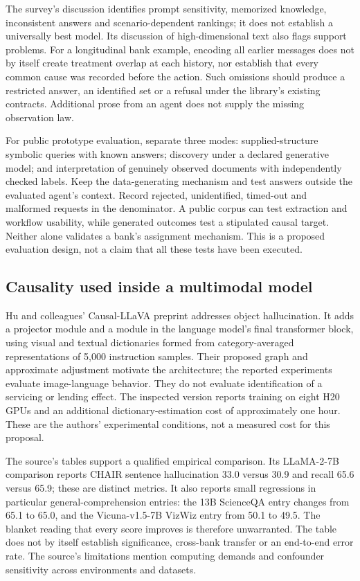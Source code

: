 The survey's discussion identifies prompt sensitivity, memorized knowledge, inconsistent answers and scenario-dependent
rankings; it does not establish a universally best model. Its discussion of high-dimensional text also flags support problems.
For a longitudinal bank example, encoding all earlier messages does not by itself create treatment overlap at each history,
nor establish that every common cause was recorded before the action. Such omissions should produce a restricted answer,
an identified set or a refusal under the library's existing contracts. Additional prose from an agent does not supply the
missing observation law.~\citep{exec28_fr_ma}

For public prototype evaluation, separate three modes: supplied-structure symbolic queries with known answers;
discovery under a declared generative model; and interpretation of genuinely observed documents with independently checked
labels. Keep the data-generating mechanism and test answers outside the evaluated agent's context. Record rejected,
unidentified, timed-out and malformed requests in the denominator. A public corpus can test extraction and workflow usability,
while generated outcomes test a stipulated causal target. Neither alone validates a bank's assignment mechanism.
This is a proposed evaluation design, not a claim that all these tests have been executed.

\subsection{Causality used inside a multimodal model}
Hu and colleagues' Causal-LLaVA preprint addresses object hallucination. It adds a projector module and a module in the
language model's final transformer block, using visual and textual dictionaries formed from category-averaged representations
of 5,000 instruction samples. Their proposed graph and approximate adjustment motivate the architecture; the reported
experiments evaluate image-language behavior. They do not evaluate identification of a servicing or lending effect.
The inspected version reports training on eight H20 GPUs and an additional dictionary-estimation cost of approximately
one hour. These are the authors' experimental conditions, not a measured cost for this proposal.~\citep{exec28_fr_hu}

The source's tables support a qualified empirical comparison. Its LLaMA-2-7B comparison reports CHAIR sentence hallucination
33.0 versus 30.9 and recall 65.6 versus 65.9; these are distinct metrics. It also reports small regressions in particular
general-comprehension entries: the 13B ScienceQA entry changes from 65.1 to 65.0, and the Vicuna-v1.5-7B VizWiz entry
from 50.1 to 49.5. The blanket reading that every score improves is therefore unwarranted. The table does not by itself
establish significance, cross-bank transfer or an end-to-end error rate. The source's limitations mention computing demands
and confounder sensitivity across environments and datasets.~\citep{exec28_fr_hu}

